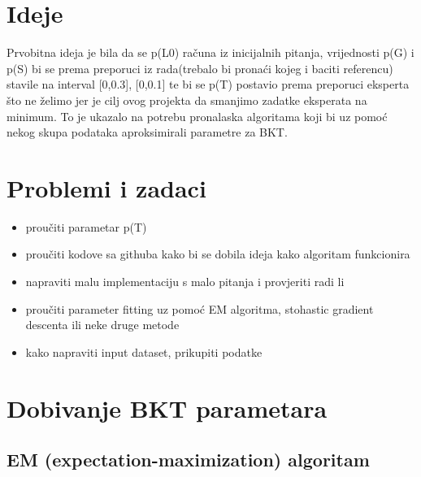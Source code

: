 \documentclass[times, utf8,projekt]{fer}
\begin{document}
\section{Ideje}
Prvobitna ideja je bila da se p(L0) računa iz inicijalnih pitanja, vrijednosti p(G) i p(S) bi se prema preporuci iz rada(trebalo bi pronaći kojeg i baciti referencu) stavile na interval [0,0.3], [0,0.1] te bi se p(T) postavio prema preporuci eksperta što ne želimo jer je cilj ovog projekta da smanjimo zadatke eksperata na minimum.\newline
To je ukazalo na potrebu pronalaska algoritama koji bi uz pomoć nekog skupa podataka aproksimirali parametre za BKT.
\section{Problemi i zadaci}
\begin{itemize}
	\item proučiti parametar p(T)
	\item proučiti kodove sa githuba kako bi se dobila ideja kako algoritam funkcionira
	\item napraviti malu implementaciju s malo pitanja i provjeriti radi li
	\item proučiti parameter fitting uz pomoć EM algoritma, stohastic gradient descenta ili neke druge metode
	\item kako napraviti input dataset, prikupiti podatke
	
	
\end{itemize}
\section{Dobivanje BKT parametara}
\subsection{EM (expectation-maximization) algoritam}
\end{document}
